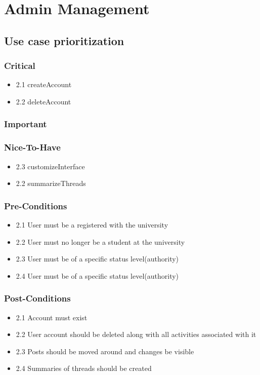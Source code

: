 \documentclass[hidelinks, 12pt, oneside]{article}
\begin{document}
\section{Admin Management}
\subsection{Use case prioritization}
\subsubsection{Critical}
\begin{itemize}
  \item 2.1 createAccount
  \item 2.2 deleteAccount
\end{itemize}
\subsubsection{Important}

\subsubsection{Nice-To-Have}
\begin{itemize}
  \item 2.3 customizeInterface
  \item 2.2 summarizeThreads
\end{itemize}
\subsubsection{Pre-Conditions}								%
\begin{itemize}
  \item 2.1 User must be a registered with the university
  \item 2.2 User must no longer be a student at the university
  \item 2.3 User must be of a specific status level(authority)
  \item 2.4 User must be of a specific status level(authority)
\end{itemize}

\subsubsection{Post-Conditions}%
\begin{itemize}
  \item 2.1 Account must exist
  \item 2.2 User account should be deleted along with all activities associated with it
  \item 2.3 Posts should be moved around and changes be visible
  \item 2.4 Summaries of threads should be created
\end{itemize}
\end{document}
